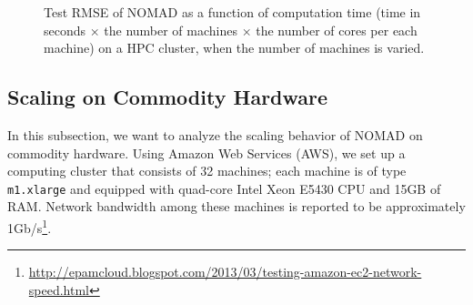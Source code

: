 \documentclass{vldb}
\begin{document}
\begin{figure*}[htbp]
  \caption{Test RMSE of NOMAD as a function of computation time (time in
    seconds $\times$ the number of machines $\times$ the number of cores
    per each machine) on a HPC cluster, when the number of machines is
    varied.}
  \label{fig:multi_converge_time}
\end{figure*}


\subsection{Scaling on Commodity Hardware}
\label{sec:ScalDiffHardw}



In this subsection, we want to analyze the scaling behavior of NOMAD
on commodity hardware.  Using Amazon Web Services (AWS), we set up a
computing cluster that consists of 32 machines; each machine is of
type \texttt{m1.xlarge} and equipped with quad-core Intel Xeon E5430
CPU and 15GB of RAM.  Network bandwidth among these machines is
reported to be approximately
1Gb/s\footnote{\url{http://epamcloud.blogspot.com/2013/03/testing-amazon-ec2-network-speed.html}}.
\end{document}
